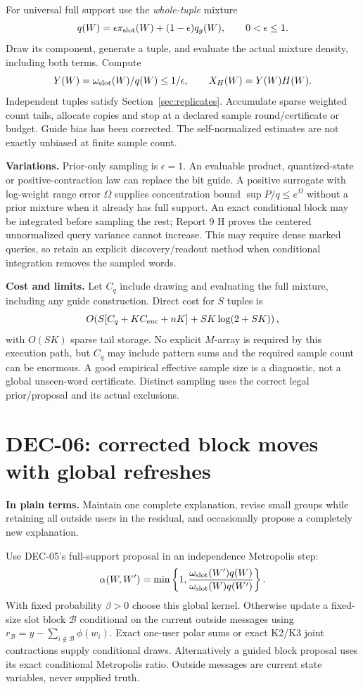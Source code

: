 \documentclass[10pt,a4paper]{article}
\begin{document}
For universal full support use the \emph{whole-tuple} mixture
\[
 q(W)=\epsilon\pi_{\rm slot}(W)+(1-\epsilon)q_g(W),\qquad 0<\epsilon\leq1.
\]
Draw its component, generate a tuple, and evaluate the actual mixture density, including both terms.
Compute
\[
 Y(W)=\omega_{\rm slot}(W)/q(W)\leq1/\epsilon,\qquad
 X_H(W)=Y(W)H(W).
\]
Independent tuples satisfy Section~\ref{sec:replicates}. Accumulate sparse weighted count tails, allocate
copies and stop at a declared sample round/certificate or budget. Guide bias has been corrected.
The self-normalized estimates are not exactly unbiased at finite sample count.

\textbf{Variations.} Prior-only sampling is $\epsilon=1$.
An evaluable product, quantized-state or positive-contraction law can replace the bit guide.
A positive surrogate with log-weight range error $\Omega$ supplies concentration bound
$\sup P/q\leq e^\Omega$ without a prior mixture when it already has full support.
An exact conditional block may be integrated before sampling the rest; Report 9 H proves the centered
unnormalized query variance cannot increase. This may require dense marked queries, so retain an explicit
discovery/readout method when conditional integration removes the sampled words.

\textbf{Cost and limits.} Let $C_q$ include drawing and evaluating the full mixture, including any guide
construction. Direct cost for $S$ tuples is
\[
 O\!\left(S[C_q+KC_{\rm enc}+nK]+SK\log(2+SK)\right),
\]
with $O(SK)$ sparse tail storage. No explicit $M$-array is required by this execution path, but $C_q$
may include pattern sums and the required sample count can be enormous. A good empirical effective
sample size is a diagnostic, not a global unseen-word certificate.
Distinct sampling uses the correct legal prior/proposal and its actual exclusions.

\clearpage
\section{DEC-06: corrected block moves with global refreshes}
\label{sec:chain}
\textbf{In plain terms.} Maintain one complete explanation, revise small groups while retaining all
outside users in the residual, and occasionally propose a completely new explanation.

Use DEC-05's full-support proposal in an independence Metropolis step:
\[
 \alpha(W,W')=\min\left\{1,
 \frac{\omega_{\rm slot}(W')q(W)}{\omega_{\rm slot}(W)q(W')}\right\}.
\]
With fixed probability $\beta>0$ choose this global kernel. Otherwise update a fixed-size slot block
$\mathcal B$ conditional on the current outside messages using
$r_{\mathcal B}=y-\sum_{i\notin\mathcal B}\phi(w_i)$.
Exact one-user polar sums or exact K2/K3 joint contractions supply conditional draws.
Alternatively a guided block proposal uses its exact conditional Metropolis ratio.
Outside messages are current state variables, never supplied truth.
\end{document}
